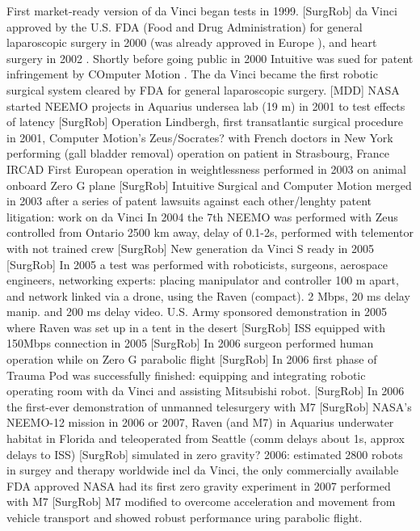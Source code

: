 First market-ready version of da Vinci began tests in 1999. [SurgRob]
da Vinci approved by the U.S. FDA (Food and Drug Administration) for general laparoscopic surgery in 2000 (was already approved in Europe \citep{bib:intuitive_monopoly}), and heart surgery in 2002 \citep{bib:brown_univ}. Shortly before going public in 2000 Intuitive was sued for patent infringement by COmputer Motion \citep{bib:intuitive_monopoly}. The da Vinci became the first robotic surgical system cleared by FDA for general laparoscopic surgery. [MDD]
NASA started NEEMO projects in Aquarius undersea lab (19 m) in 2001 to test effects of latency [SurgRob]
Operation Lindbergh, first transatlantic surgical procedure in 2001, Computer Motion's Zeus/Socrates? with French doctors in New York performing (gall bladder removal) operation on patient in Strasbourg, France IRCAD
First European operation in weightlessness performed in 2003 on animal onboard Zero G plane [SurgRob]
Intuitive Surgical and Computer Motion merged in 2003 \citep{bib:telesurg_history} after a series of patent lawsuits against each other/lenghty patent litigation: work on da Vinci \citep{bib:intuitive_monopoly}
In 2004 the 7th NEEMO was performed with Zeus controlled from Ontario 2500 km away, delay of 0.1-2s, performed with telementor with not trained crew [SurgRob]
New generation da Vinci S ready in 2005 [SurgRob]
In 2005 a test was performed with roboticists, surgeons, aerospace engineers, networking experts: placing manipulator and controller 100 m apart, and network linked via a drone, using the Raven \citep{bib:docatadist} (compact). 2 Mbps, 20 ms delay manip. and 200 ms delay video. U.S. Army sponsored demonstration in 2005 where Raven was set up in a tent in the desert [SurgRob]
ISS equipped with 150Mbps connection in 2005 [SurgRob]
In 2006 surgeon performed human operation while on Zero G parabolic flight [SurgRob] 
In 2006 first phase of Trauma Pod was successfully finished: equipping and integrating robotic operating room  with da Vinci and assisting Mitsubishi robot. [SurgRob]
In 2006 the first-ever demonstration of unmanned telesurgery with M7 [SurgRob]
NASA's NEEMO-12 mission in 2006 or 2007, Raven (and M7) in Aquarius underwater habitat in Florida and teleoperated from Seattle (comm delays about 1s, approx delays to ISS) [SurgRob] simulated in zero gravity?
2006: estimated 2800 robots in surgey and therapy worldwide incl da Vinci, the only commercially available FDA approved
NASA had its first zero gravity experiment in 2007 performed with M7 [SurgRob] M7 modified to overcome acceleration and movement from vehicle transport and showed robust performance uring parabolic flight.
